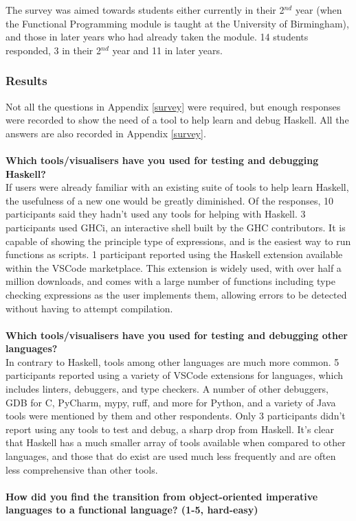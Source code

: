 The survey was aimed towards students either currently in their 2$^{nd}$ year (when the Functional Programming module is taught at the University of Birmingham), and those in later years who had already taken the module. 14 students responded, 3 in their 2$^{nd}$ year and 11 in later years.

\subsubsection{Results}
Not all the questions in Appendix \ref{survey} were required, but enough responses were recorded to show the need of a tool to help learn and debug Haskell. All the answers are also recorded in Appendix \ref{survey}.
\\\\\textbf{Which tools/visualisers have you used for testing and debugging Haskell?}\\
If users were already familiar with an existing suite of tools to help learn Haskell, the usefulness of a new one would be greatly diminished. 
Of the responses, 10 participants said they hadn't used any tools for helping with Haskell. 3 participants used GHCi, an interactive shell built by the GHC contributors. It is capable of showing the principle type of expressions, and is the easiest way to run functions as scripts. 1 participant reported using the Haskell extension available within the VSCode marketplace. This extension is widely used, with over half a million downloads, and comes with a large number of functions including type checking expressions as the user implements them, allowing errors to be detected without having to attempt compilation.
\\\\\textbf{Which tools/visualisers have you used for testing and debugging other languages?}\\
In contrary to Haskell, tools among other languages are much more common. 5 participants reported using a variety of VSCode extensions for languages, which includes linters, debuggers, and type checkers. A number of other debuggers, GDB for C, PyCharm, mypy, ruff, and more for Python, and a variety of Java tools were mentioned by them and other respondents.
Only 3 participants didn't report using any tools to test and debug, a sharp drop from Haskell.
It's clear that Haskell has a much smaller array of tools available when compared to other languages, and those that do exist are used much less frequently and are often less comprehensive than other tools.
\\\\\textbf{How did you find the transition from object-oriented imperative languages to a functional language? (1-5, hard-easy)}\\
